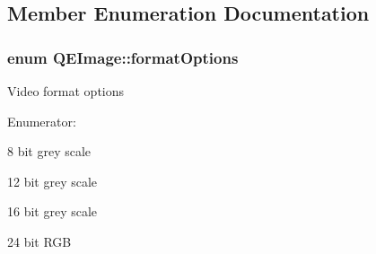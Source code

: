 \subsection{Member Enumeration Documentation}
\hypertarget{classQEImage_aec1df5ac4b48c529744b48de7722c55e}{
\subsubsection[{formatOptions}]{\setlength{\rightskip}{0pt plus 5cm}enum {\bf QEImage::formatOptions}}}
\label{classQEImage_aec1df5ac4b48c529744b48de7722c55e}
Video format options \begin{Desc}
\item[Enumerator: ]\par
\begin{description}
\item[{\em 
\hypertarget{classQEImage_aec1df5ac4b48c529744b48de7722c55ea266064fd0b145012c7aa8963d517d67c}{
GREY8}
\label{classQEImage_aec1df5ac4b48c529744b48de7722c55ea266064fd0b145012c7aa8963d517d67c}
}]8 bit grey scale \item[{\em 
\hypertarget{classQEImage_aec1df5ac4b48c529744b48de7722c55eaaeac65899916ef3f61156e0fb47a9995}{
GREY12}
\label{classQEImage_aec1df5ac4b48c529744b48de7722c55eaaeac65899916ef3f61156e0fb47a9995}
}]12 bit grey scale \item[{\em 
\hypertarget{classQEImage_aec1df5ac4b48c529744b48de7722c55ea5301ac5f1734b260f5d949e7db59650f}{
GREY16}
\label{classQEImage_aec1df5ac4b48c529744b48de7722c55ea5301ac5f1734b260f5d949e7db59650f}
}]16 bit grey scale \item[{\em 
\hypertarget{classQEImage_aec1df5ac4b48c529744b48de7722c55ea1fb9652f463587aa13108cca8229358e}{
RGB\_\-888}
\label{classQEImage_aec1df5ac4b48c529744b48de7722c55ea1fb9652f463587aa13108cca8229358e}
}]24 bit RGB \end{description}
\end{Desc}

